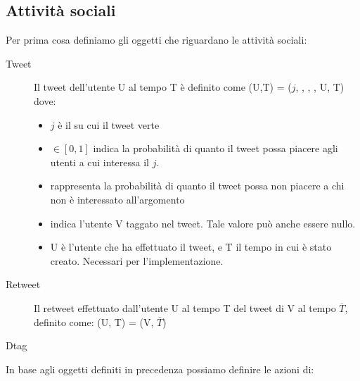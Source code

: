 \subsection{Attivit\`a sociali}
\label{subsec:social}

Per prima cosa definiamo gli oggetti che riguardano le attivit\`a 
sociali:

\begin{description}
  \item[Tweet] Il tweet dell'utente U al tempo T \`e definito come
  \twt{}(U,T) = ($j$, \lika{}, \disla{}, \dtag, U, T) dove:
  \begin{itemize}
    \item $j$ \`e il \topic{} su cui il tweet verte
    \item \lika{} $\in [0,1]$ indica la probabilit\`a di quanto
    il tweet possa piacere agli utenti a cui interessa il 
    \topic{} $j$. 
    \item \disla{} rappresenta la probabilit\`a di quanto il tweet 
    possa non piacere a chi non \`e interessato all'argomento
    \item \dtag{} indica l'utente V taggato nel tweet. Tale valore 
    pu\`o anche essere nullo.
    \item U \`e l'utente che ha effettuato il tweet, e T il tempo in
    cui \`e stato creato.
    Necessari per l'implementazione.
  \end{itemize}
  
  \item[Retweet] Il retweet effettuato dall'utente U al tempo T
  del tweet di V al tempo $\overline{T}$, definito come:
  \retwt{}(U, T) = \twt{}(V, $\overline{T}$)
  
  \item[Dtag]
\end{description}

In base agli oggetti definiti in precedenza possiamo definire le 
azioni di:

